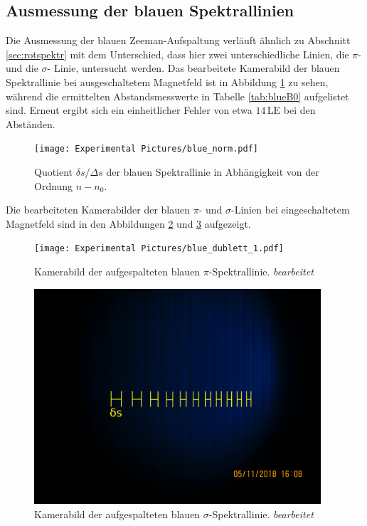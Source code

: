 \subsection{Ausmessung der blauen Spektrallinien}

Die Ausmessung der blauen Zeeman-Aufspaltung verläuft ähnlich zu Abschnitt \ref{sec:rotspektr}
mit dem Unterschied, dass hier zwei unterschiedliche Linien, die $\pi$- und die $\sigma$- Linie,
untersucht werden. Das bearbeitete Kamerabild der blauen Spektrallinie bei ausgeschaltetem Magnetfeld
ist in Abbildung \ref{fig:blueB0} zu sehen, während die ermittelten Abstandsmesswerte in Tabelle \ref{tab:blueB0}
aufgelistet sind. Erneut ergibt sich ein einheitlicher Fehler von etwa $14 \, \text{LE}$ bei den
Abständen.

\begin{figure}[H]
  \centering
  \texttt{[image: Experimental Pictures/blue\_norm.pdf]}
  \caption{Quotient $\delta s/\Delta s$ der blauen Spektrallinie in Abhängigkeit von der Ordnung $n-n_0$.}
  \label{fig:blueB0}
\end{figure}

Die bearbeiteten Kamerabilder der blauen $\pi$- und $\sigma$-Linien bei eingeschaltetem
Magnetfeld sind in den Abbildungen \ref{fig:bluepi} und \ref{fig:bluesigma} aufgezeigt.

\begin{figure}[H]
  \centering
  \texttt{[image: Experimental Pictures/blue\_dublett\_1.pdf]}
  \caption{Kamerabild der aufgespalteten blauen $\pi$-Spektrallinie. \textit{bearbeitet}}
  \label{fig:bluepi}
\end{figure}

\begin{figure}[H]
  \centering
  \includegraphics[height=8cm]{Experimental Pictures/blue_dublett_2.pdf}
  \caption{Kamerabild der aufgespalteten blauen $\sigma$-Spektrallinie. \textit{bearbeitet}}
  \label{fig:bluesigma}
\end{figure}

